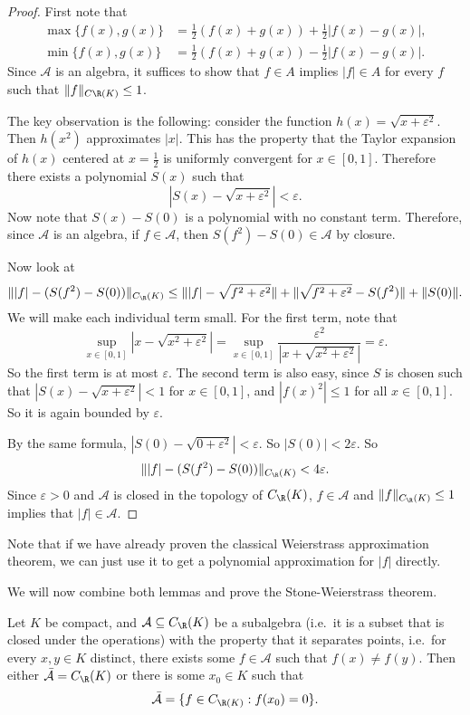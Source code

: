 \documentclass[a4paper]{article}
\begin{document}
\begin{proof}
  First note that
  \begin{align*}
    \max\{f(x), g(x)\} &= \frac{1}{2}(f(x) + g(x)) + \frac{1}{2}|f(x) - g(x)|,\\
    \min\{f(x), g(x)\} &= \frac{1}{2}(f(x) + g(x)) - \frac{1}{2}|f(x) - g(x)|.
  \end{align*}
  Since $\mathcal{A}$ is an algebra, it suffices to show that $f \in A$ implies $|f| \in A$ for every $f$ such that $\|f\|_{C\R(K)} \leq 1$.

  The key observation is the following: consider the function $h(x) = \sqrt{x + \varepsilon^2}$. Then $h(x^2)$ approximates $|x|$. This has the property that the Taylor expansion of $h(x)$ centered at $x = \frac{1}{2}$ is uniformly convergent for $x \in [0, 1]$. Therefore there exists a polynomial $S(x)$ such that
  \[
    |S(x) - \sqrt{x + \varepsilon^2}| < \varepsilon.
  \]
  Now note that $S(x) - S(0)$ is a polynomial with no constant term. Therefore, since $\mathcal{A}$ is an algebra, if $f \in \mathcal{A}$, then $S(f^2) - S(0) \in \mathcal{A}$ by closure.

  Now look at
  \[
    \||f| - (S(f^2) - S(0))\|_{C_\R(K)} \leq \||f| - \sqrt{f^2 + \varepsilon^2}\| + \|\sqrt{f^2 + \varepsilon^2} - S(f^2)\| + \|S(0)\|.
  \]
  We will make each individual term small. For the first term, note that
  \[
    \sup_{x \in [0, 1]} |x - \sqrt{x^2 + \varepsilon^2}| = \sup_{x \in [0, 1]} \frac{\varepsilon^2}{|x + \sqrt{x^2 + \varepsilon^2}|} = \varepsilon.
  \]
  So the first term is at most $\varepsilon$. The second term is also easy, since $S$ is chosen such that $|S(x) - \sqrt{x + \varepsilon^2}| < 1$ for $x \in [0, 1]$, and $|f(x)^2| \leq 1$ for all $x \in [0, 1]$. So it is again bounded by $\varepsilon$.

  By the same formula, $|S(0) - \sqrt{0 + \varepsilon^2}| < \varepsilon$. So $|S(0)| < 2\varepsilon$. So
  \[
    \||f| - (S(f^2) - S(0))\|_{C_\R(K)} < 4\varepsilon.
  \]
  Since $\varepsilon > 0$ and $\mathcal{A}$ is closed in the topology of $C_{\R}(K)$, $f\in \mathcal{A}$ and $\|f\|_{C_\R(K)} \leq 1$ implies that $|f| \in \mathcal{A}$.
\end{proof}
Note that if we have already proven the classical Weierstrass approximation theorem, we can just use it to get a polynomial approximation for $|f|$ directly.

We will now combine both lemmas and prove the Stone-Weierstrass theorem.
\begin{thm}
  Let $K$ be compact, and $\mathcal{A} \subseteq C_{\R}(K)$ be a subalgebra (i.e.\ it is a subset that is closed under the operations) with the property that it separates points, i.e.\ for every $x, y \in K$ distinct, there exists some $f \in \mathcal{A}$ such that $f(x) \not= f(y)$. Then either $\bar{\mathcal{A}} = C_\R(K)$ or there is some $x_0 \in K$ such that
  \[
    \bar{\mathcal{A}} = \{f \in C_{\R(K)}: f(x_0) = 0\}.
  \]
\end{thm}
\end{document}
